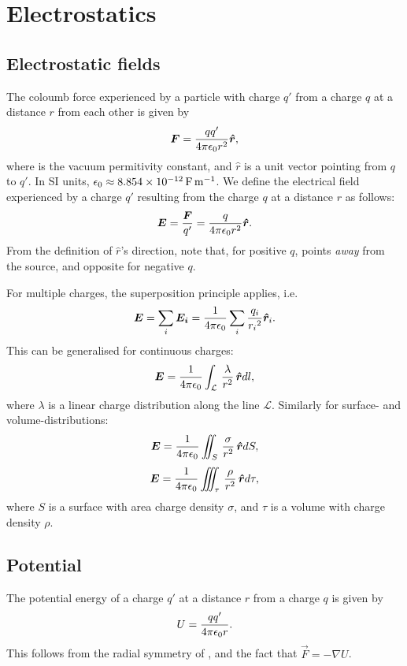 \section{Electrostatics}
\subsection{Electrostatic fields}
    The coloumb force experienced by a particle with charge $q'$ from a charge $q$ at a distance $r$ from each other is given by 
    \begin{equation}
        \vec{F} = \frac{qq'}{4\pi\e r^2}\hat{r},
    \end{equation}
    where \e is the vacuum permitivity constant, and $\hat{r}$ is a unit vector pointing from $q$ to $q'$. 
    In SI units, $\epsilon_0 \approx \SI{8.854e-12}{\farad \per \metre}$.
    We define the electrical field experienced by a charge $q'$ resulting from the charge $q$ at a distance $r$ as follows:
    \begin{equation}
        \E = \frac{\vec{F}}{q'} = \frac{q}{4\pi\e r^2}\hat{r}.
    \end{equation}
    From the definition of $\hat{r}$'s direction, note that, for positive $q$, 
    \E{} points \textit{away} from the source, and opposite for negative $q$.
    
    For multiple charges, the superposition principle applies, i.e. 
    \begin{equation}
        \E = \sum_i\vec{E_i} = \frac{1}{4\pi\e}\sum_i\frac{q_i}{{r_i}^2}\hat{r}_i.
    \end{equation}
    This can be generalised for continuous charges: 
    \begin{equation}
        \E = \frac{1}{4\pi\e}\int_\mathcal{L}\,\frac{\lambda}{r^2}\,\hat{r}dl,
    \end{equation}
    where $\lambda$ is a linear charge distribution along the line $\mathcal{L}$. Similarly for surface- and volume-distributions: 
    \begin{equation}
        \E = \frac{1}{4\pi\e}\iint_S\,\frac{\sigma}{r^2}\,\hat{r}dS,
    \end{equation}
    \begin{equation}
        \E = \frac{1}{4\pi\e}\iiint_{\tau}\,\frac{\rho}{r^2}\,\hat{r}d\tau,
    \end{equation}
    where $S$ is a surface with area charge density $\sigma$, and $\tau$ is a volume with charge density $\rho$.
    
\subsection{Potential}
    The potential energy of a charge $q'$ at a distance $r$ from a charge $q$ is given by
    \begin{equation}
        U = \frac{qq'}{4\pi\epsilon_0 r}.
    \end{equation}
    This follows from the radial symmetry of \E, and the fact that $\vec{F} = - \nabla U$.
    
